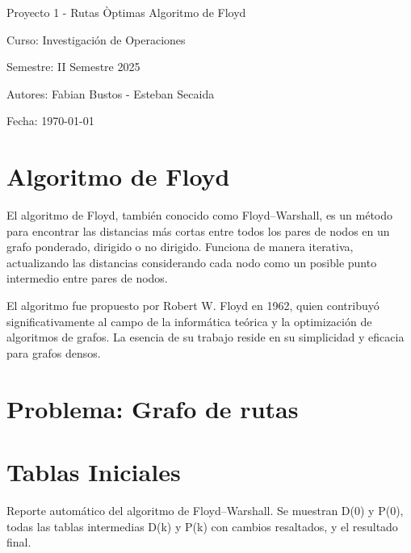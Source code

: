 \documentclass{article}
\begin{document}
\begin{titlepage}
  \centering
  \vfill
  {\Huge Proyecto 1 - Rutas Òptimas Algoritmo de Floyd}\par
  \vspace{1cm}
  {\Large Curso: Investigación de Operaciones}\par
  {\Large Semestre: II Semestre 2025}\par
  \vfill
  {\Large Autores: Fabian Bustos - Esteban Secaida}\par
  \vspace{1cm}
  {\large Fecha: \today}\par
  \vfill
\end{titlepage}

\section*{Algoritmo de Floyd}
El algoritmo de Floyd, también conocido como Floyd--Warshall, es un método para encontrar las distancias más cortas entre todos los pares de nodos en un grafo ponderado, dirigido o no dirigido. Funciona de manera iterativa, actualizando las distancias considerando cada nodo como un posible punto intermedio entre pares de nodos.

El algoritmo fue propuesto por Robert W. Floyd en 1962, quien contribuyó significativamente al campo de la informática teórica y la optimización de algoritmos de grafos. La esencia de su trabajo reside en su simplicidad y eficacia para grafos densos.

\section*{Problema: Grafo de rutas}
\section*{Tablas Iniciales}
Reporte automático del algoritmo de Floyd--Warshall. Se muestran D(0) y P(0), todas las tablas intermedias D(k) y P(k) con cambios resaltados, y el resultado final.
\end{document}
